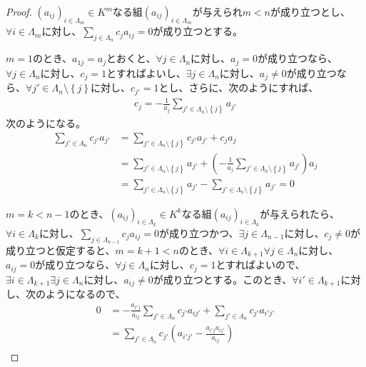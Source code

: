 \documentclass[dvipdfmx]{jsarticle}
\begin{document}
\begin{proof}
$\left( a_{ij} \right)_{i \in \varLambda_{m}} \in K^{m}$なる組$\left( a_{ij} \right)_{i \in \varLambda_{m}}$が与えられ$m < n$が成り立つとし、$\forall i \in \varLambda_{m}$に対し、$\sum_{j \in \varLambda_{n}} {c_{j}a_{ij}} = 0$が成り立つとする。\par
$m = 1$のとき、$a_{1j} = a_{j}$とおくと、$\forall j \in \varLambda_{n}$に対し、$a_{j} = 0$が成り立つなら、$\forall j \in \varLambda_{n}$に対し、$c_{j} = 1$とすればよいし、$\exists j \in \varLambda_{n}$に対し、$a_{j} \neq 0$が成り立つなら、$\forall j' \in \varLambda_{n} \setminus \left\{ j \right\}$に対し、$c_{j'} = 1$とし、さらに、次のようにすれば、
\begin{align*}
c_{j} = - \frac{1}{a_{j}}\sum_{j' \in \varLambda_{n} \setminus \left\{ j \right\}} a_{j'}
\end{align*}
次のようになる。
\begin{align*}
\sum_{j' \in \varLambda_{n}} {c_{j'}a_{j'}} &=\sum_{j' \in \varLambda_{n} \setminus \left\{ j \right\}} {c_{j'}a_{j'}} + c_{j}a_{j}\\
&=\sum_{j' \in \varLambda_{n} \setminus \left\{ j \right\}} a_{j'} + \left( - \frac{1}{a_{j}}\sum_{j' \in \varLambda_{n} \setminus \left\{ j \right\}} a_{j'} \right)a_{j}\\
&=\sum_{j' \in \varLambda_{n} \setminus \left\{ j \right\}} a_{j'} - \sum_{j' \in \varLambda_{n} \setminus \left\{ j \right\}} a_{j'} = 0
\end{align*}\par
$m = k < n - 1$のとき、$\left( a_{ij} \right)_{i \in \varLambda_{k}} \in K^{k}$なる組$\left( a_{ij} \right)_{i \in \varLambda_{k}}$が与えられたら、$\forall i \in \varLambda_{k}$に対し、$\sum_{j \in \varLambda_{n - 1}} {c_{j}a_{ij}}=0$が成り立つかつ、$\exists j \in \varLambda_{n - 1}$に対し、$c_{j} \neq 0$が成り立つと仮定すると、$m = k + 1 < n$のとき、$\forall i \in \varLambda_{k + 1}\forall j \in \varLambda_{n}$に対し、$a_{ij} = 0$が成り立つなら、$\forall j \in \varLambda_{n}$に対し、$c_{j} = 1$とすればよいので、$\exists i \in \varLambda_{k + 1}\exists j \in \varLambda_{n}$に対し、$a_{ij} \neq 0$が成り立つとする。このとき、$\forall i' \in \varLambda_{k + 1}$に対し、次のようになるので、
\begin{align*}
0 &= - \frac{a_{i'j}}{a_{ij}}\sum_{j' \in \varLambda_{n}} {c_{j'}a_{ij'}} + \sum_{j' \in \varLambda_{n}} {c_{j'}a_{i'j'}}\\
&= \sum_{j' \in \varLambda_{n}} {c_{j'}\left( a_{i'j'} - \frac{a_{i'j}a_{ij'}}{a_{ij}} \right)}\\

\end{align*}
\end{proof}
\end{document}
